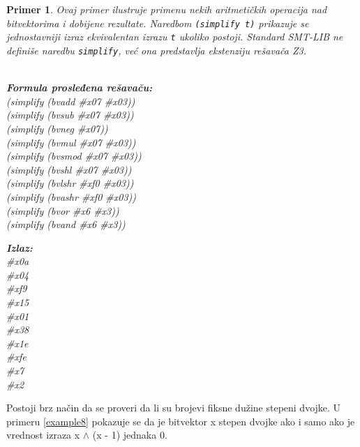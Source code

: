 \documentclass[12pt,oneside]{memoir}
\newtheorem{primer}{Primer}
\begin{document}
\begin{primer} \label{example7} 
Ovaj primer ilustruje primenu nekih aritmetičkih operacija nad bitvektorima i dobijene rezultate. Naredbom \texttt{(simplify t)} prikazuje se jednostavniji izraz ekvivalentan izrazu \texttt{t} ukoliko postoji. Standard SMT-LIB ne definiše naredbu \texttt{simplify}, već ona predstavlja ekstenziju rešavača Z3.
\\ \\
\begin{minipage}[b]{0.5\textwidth}
\textbf{Formula prosleđena rešavaču:}
\\(simplify (bvadd \#x07 \#x03)) 
\\(simplify (bvsub \#x07 \#x03)) 
\\(simplify (bvneg \#x07))       
\\(simplify (bvmul \#x07 \#x03)) 
\\(simplify (bvsmod \#x07 \#x03)) 
\\(simplify (bvshl \#x07 \#x03)) 
\\(simplify (bvlshr \#xf0 \#x03))  
\\(simplify (bvashr \#xf0 \#x03))  
\\(simplify (bvor \#x6 \#x3)) 
\\(simplify (bvand \#x6 \#x3))   
\end{minipage}
\hspace{2.5cm}
\begin{minipage}[b]{0.5\textwidth}
\textbf{Izlaz:}
\\\#x0a 
\\\#x04 
\\\#xf9 
\\\#x15 
\\\#x01 
\\\#x38 
\\\#x1e 
\\\#xfe
\\\#x7 
\\\#x2 
\end{minipage}

\end{primer} \par
Postoji brz način da se proveri da li su brojevi fiksne dužine stepeni dvojke. U primeru \ref{example8} pokazuje se da je bitvektor x stepen dvojke ako i samo ako je vrednost izraza x $\land$ (x - 1) jednaka 0.
\end{document}
